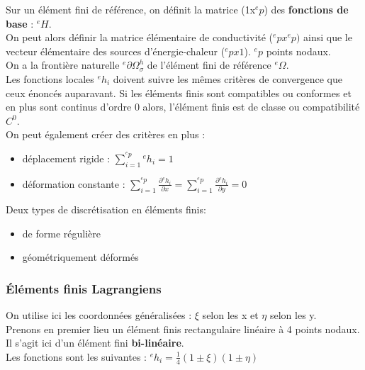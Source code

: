 \documentclass[../main.tex]{subfiles}
\begin{document}
Sur un élément fini de référence, on définit la matrice (1x${}^ep$) des \textbf{fonctions de base} : ${}^eH$.\\
On peut alors définir la matrice élémentaire de conductivité (${}^epx{}^ep)$ ainsi que le vecteur élémentaire des sources d'énergie-chaleur (${}^epx1$). ${}^ep$ points nodaux.\\

On a la frontière naturelle ${}^e\partial \Omega_\sigma^h$ de l'élément fini de référence ${}^e\Omega$.\\

Les fonctions locales ${}^eh_i$ doivent suivre les mêmes critères de convergence que ceux énoncés auparavant. Si les éléments finis sont compatibles ou conformes et en plus sont continus d'ordre 0 alors, l'élément finis est de classe ou compatibilité $C^0$.\\

On peut également créer des critères en plus : \begin{itemize}
    \item déplacement rigide : $\sum_{i=1}^{{}^ep} {}^e h_i=1$\\
    \item déformation constante : $\sum_{i=1}^{{}^ep} \frac{\partial {}^eh_i}{\partial x} = \sum_{i=1}^{{}^ep} \frac{\partial {}^eh_i}{\partial y} = 0$\\
\end{itemize}

Deux types de discrétisation en éléments finis:
\begin{itemize}
    \item de forme régulière\\
    \item géométriquement déformés\\
\end{itemize}


\subsubsection{Éléments finis Lagrangiens}
On utilise ici les coordonnées généralisées : $\xi$ selon les x et $\eta$ selon les y.\\

Prenons en premier lieu un élément finis rectangulaire linéaire à 4 points nodaux. Il s'agit ici d'un élément fini \textbf{bi-linéaire}.\\

Les fonctions sont les suivantes : ${}^eh_i = \frac{1}{4}(1\pm \xi)(1 \pm \eta)$\\
\end{document}
